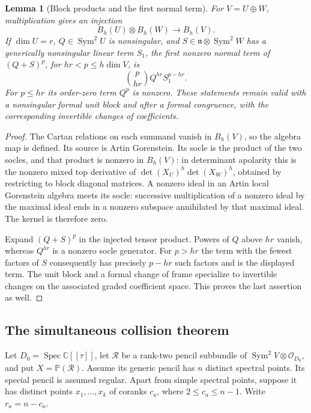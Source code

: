 \documentclass[11pt,reqno]{amsart}
\numberwithin{equation}{section}
\newtheorem{lemma}[theorem]{Lemma}
\theoremstyle{definition}\newtheorem{definition}[theorem]{Definition}
\theoremstyle{remark}\newtheorem{remark}[theorem]{Remark}
\newcommand{\C}{\mathbb C}\newcommand{\Q}{\mathbb Q}
\newcommand{\Pj}{\mathbb P}\newcommand{\A}{\mathbb A}
\newcommand{\OO}{\mathcal O}\newcommand{\II}{\mathcal I}
\DeclareMathOperator{\Sym}{Sym}\DeclareMathOperator{\Gr}{Gr}
\DeclareMathOperator{\Spec}{Spec}\DeclareMathOperator{\PGL}{PGL}
\begin{document}
\begin{lemma}[Block products and the first normal term]
\label{lem:block-products-v159}
For $V=U\oplus W$, multiplication gives an injection
\[
                 B_h(U)\otimes B_h(W)\longrightarrow B_h(V).
\]
If $\dim U=r$, $Q\in\Sym^2U$ is nonsingular, and
$S\in\mathfrak n\otimes\Sym^2W$ has a generically nonsingular linear term $S_1$, the first
nonzero normal term of $(Q+S)^p$, for $hr<p\leq h\dim V$, is
\[
                  \binom p{hr}Q^{hr}S_1^{p-hr}.
\]
For $p\leq hr$ its order-zero term $Q^p$ is nonzero. These statements
remain valid with a nonsingular formal unit block and after a formal
congruence, with the corresponding invertible changes of coefficients.
\end{lemma}
\begin{proof}
The Cartan relations on each summand vanish in $B_h(V)$, so the
algebra map is defined. Its source is Artin Gorenstein. Its socle is
the product of the two socles, and that product is nonzero in $B_h(V)$:
in determinant apolarity this is the nonzero mixed top derivative
of $\det(X_U)^h\det(X_W)^h$, obtained by restricting to block
diagonal matrices. A nonzero ideal in an Artin local Gorenstein
algebra meets its socle: successive multiplication of a nonzero
ideal by the maximal ideal ends in a nonzero subspace annihilated
by that maximal ideal. The kernel is therefore zero.

Expand $(Q+S)^p$ in the injected tensor product. Powers of $Q$
above $hr$ vanish, whereas $Q^{hr}$ is a nonzero socle generator.
For $p>hr$ the term with the fewest factors of $S$ consequently
has precisely $p-hr$ such factors and is the displayed term.
The unit block and a formal change of frame specialize to invertible
changes on the associated graded coefficient space. This proves the
last assertion as well.
\end{proof}

\subsection{The simultaneous collision theorem}
Let $D_0=\Spec\C[[\tau]]$, let $\mathcal R$ be a rank-two pencil
subbundle of $\Sym^2V\otimes\OO_{D_0}$, and put
$X=\Pj(\mathcal R)$. Assume its generic pencil has $n$ distinct
spectral points. Its special pencil is assumed regular. Apart from
simple spectral points, suppose it has distinct points
$x_1,\ldots,x_k$ of coranks $c_a$, where $2\leq c_a\leq n-1$.
Write $r_a=n-c_a$.
\end{document}
